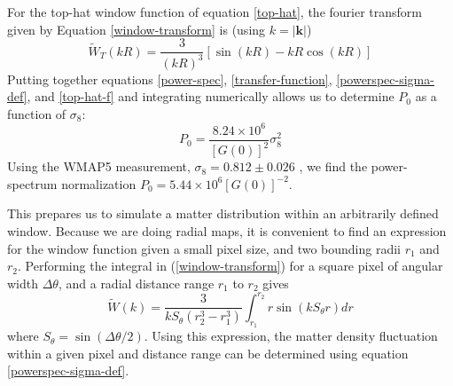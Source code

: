 \documentclass[12pt,preprint]{aastex}			%
\begin{document}
For the top-hat window function of equation \ref{top-hat}, 
the fourier transform given by Equation \ref{window-transform}
is (using $k = |\mathbf{k}|$)
\begin{equation}
  \label{top-hat-f}
  \widetilde{W}_T(kR) = \frac{3}{(kR)^3}\left[\sin(kR) - kR\cos(kR) \right]
\end{equation}
Putting together equations \ref{power-spec}, \ref{transfer-function},
\ref{powerspec-sigma-def}, and \ref{top-hat-f} and integrating numerically
allows us to determine $P_0$ as a function of $\sigma_8$:
\begin{equation}
  P_0 = \frac{8.24 \times 10^6}{[G(0)]^2}\sigma_8^2
\end{equation}
Using the WMAP5 measurement, $\sigma_8 = 0.812 \pm 0.026$ \citep{Hinshaw09}, 
we find the power-spectrum normalization $P_0 = 5.44 \times 10^6 [G(0)]^{-2}$.

This prepares us to simulate a matter distribution within an arbitrarily 
defined window.  Because we are doing radial maps, it is convenient to find 
an expression for the window function given a small pixel size, and two 
bounding radii $r_1$ and $r_2$.  Performing the integral in 
(\ref{window-transform}) for a square pixel of angular width
$\Delta \theta$, and a radial distance range $r_1$ to $r_2$ gives
\begin{equation}
  \widetilde{W}(k) = \frac{3}{kS_\theta(r_2^3 - r_1^3)} \int_{r_1}^{r_2}
    r \sin \left( kS_\theta r \right)dr
\end{equation} 
where $S_\theta = \sin(\Delta\theta/2)$.  Using this expression, the matter
density fluctuation within a given pixel and distance range can be determined 
using equation \ref{powerspec-sigma-def}.
\end{document}
